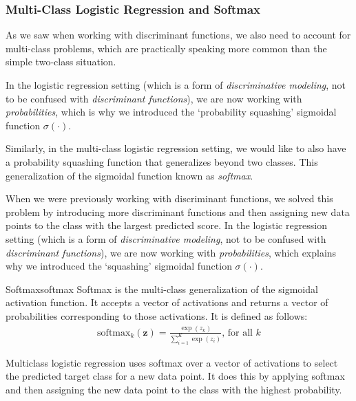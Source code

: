\subsubsection{Multi-Class Logistic Regression and Softmax}
As we saw when working with discriminant functions, we also need to account for multi-class problems, which are practically speaking more common than the simple two-class situation.

In the logistic regression setting (which is a form of \textit{discriminative modeling}, not to be confused with \textit{discriminant functions}), we are now working with \textit{probabilities}, which is why we introduced the `probability squashing' sigmoidal function $\sigma(\cdot)$.

Similarly, in the multi-class logistic regression setting, we would like to also have a probability squashing function that generalizes beyond two classes. This generalization of the sigmoidal function known as \textit{softmax}.

When we were previously working with discriminant functions, we solved this problem by introducing more discriminant functions and then assigning new data points to the class with the largest predicted score. In the logistic regression setting (which is a form of \textit{discriminative modeling}, not to be confused with \textit{discriminant functions}), we are now working with \textit{probabilities}, which explains why we introduced the `squashing' sigmoidal function $\sigma(\cdot)$.

\begin{definition}{Softmax}{softmax}
Softmax is the multi-class generalization of the sigmoidal activation function. It accepts a vector of activations and returns a vector of probabilities corresponding to those activations. It is defined as follows:
\begin{align*}
	\text{softmax}_{k}(\textbf{z}) = \frac{\exp{(z_{k})}}{\sum_{i=1}^{K} \exp{(z_{i})}}\text{, for all $k$}
\end{align*}
\end{definition}

Multiclass logistic regression uses softmax over a vector of activations to select the predicted target class for a new data point. It does this by applying softmax and then assigning the new data point to the class with the highest probability.

